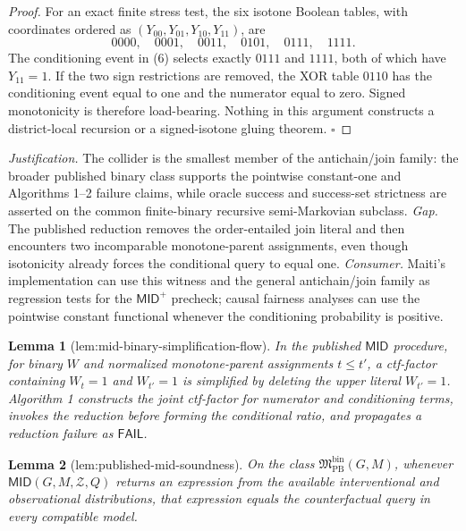 \documentclass{article}
\newtheorem{lemma}{Lemma}
\begin{document}
\begin{proof}
For an exact finite stress test, the six isotone Boolean tables, with coordinates ordered as \((Y_{00},Y_{01},Y_{10},Y_{11})\), are
\[
 0000,\quad 0001,\quad 0011,\quad 0101,\quad 0111,\quad 1111.
\]
The conditioning event in (6) selects exactly \(0111\) and \(1111\), both of which have \(Y_{11}=1\).  If the two sign restrictions are removed, the XOR table \(0110\) has the conditioning event equal to one and the numerator equal to zero.  Signed monotonicity is therefore load-bearing.  Nothing in this argument constructs a district-local recursion or a signed-isotone gluing theorem. \(\square\)
\end{proof}
\par\smallskip\noindent \textit{Justification.} The collider is the smallest member of the antichain/join family: the broader published binary class supports the pointwise constant-one and Algorithms 1--2 failure claims, while oracle success and success-set strictness are asserted on the common finite-binary recursive semi-Markovian subclass. \textit{Gap.} The published reduction removes the order-entailed join literal and then encounters two incomparable monotone-parent assignments, even though isotonicity already forces the conditional query to equal one. \textit{Consumer.} Maiti's implementation can use this witness and the general antichain/join family as regression tests for the \(\mathsf{MID}^{+}\) precheck; causal fairness analyses can use the pointwise constant functional whenever the conditioning probability is positive.

\begin{lemma}[lem:mid-binary-simplification-flow]\label{lem:mid-binary-simplification-flow}
In the published \(\mathsf{MID}\) procedure, for binary \(W\) and normalized monotone-parent assignments \(t\le t'\), a ctf-factor containing \(W_t=1\) and \(W_{t'}=1\) is simplified by deleting the upper literal \(W_{t'}=1\). Algorithm 1 constructs the joint ctf-factor for numerator and conditioning terms, invokes the reduction before forming the conditional ratio, and propagates a reduction failure as \(\mathsf{FAIL}\).
\end{lemma}

\begin{lemma}[lem:published-mid-soundness]\label{lem:published-mid-soundness}
On the class \(\mathfrak M_{\mathrm{PB}}^{\mathrm{bin}}(G,M)\), whenever \(\mathsf{MID}(G,M,\mathcal Z,Q)\) returns an expression from the available interventional and observational distributions, that expression equals the counterfactual query in every compatible model.
\end{lemma}
\end{document}
